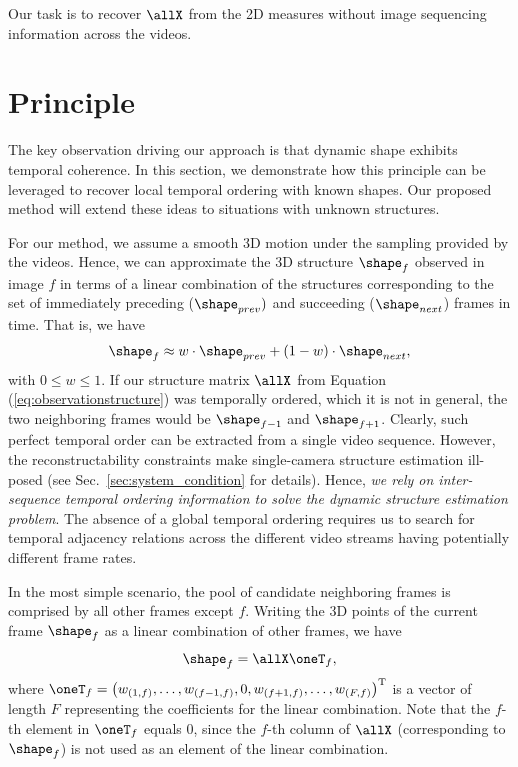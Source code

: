 Our task is to recover  $\allX$ from the 2D measures without image sequencing information across the videos.



\section{Principle} \label{sec:principle}
The key observation driving our approach is that dynamic shape exhibits temporal coherence. In this section, we demonstrate how this principle can be leveraged to recover local temporal ordering with known shapes. Our proposed method will extend these ideas to situations with unknown structures.

For our method, we assume a smooth 3D motion under the sampling provided by the videos.
Hence, we can approximate the 3D structure  $\shape_f$ observed in image $f$ in terms of a linear combination of the structures corresponding to the set of immediately preceding ($\shape_{prev})$ and succeeding ($\shape_{next}$) frames in time.
That is, we have
\begin{equation}
\shape_f \approx w \cdot \shape_{prev} + (1-w) \cdot \shape_{next},
\label{eq:linear_comb_2}
\end{equation}
with $0 \leq w \leq 1$.
If our structure matrix $\allX$ from Equation (\ref{eq:observationstructure}) was temporally ordered, which it is not in general, the two neighboring frames would be $\shape_{f-1}$ and $\shape_{f+1}$.
Clearly, such perfect temporal order can be extracted from a single video sequence. However, the reconstructability constraints 
make single-camera structure estimation ill-posed (see Sec.~\ref{sec:system_condition} for details). Hence, \textit{we rely on inter-sequence temporal ordering information to solve the dynamic structure estimation problem}. The absence of a global temporal ordering requires us to search for temporal adjacency relations across the different video streams having potentially different frame rates. 

In the most simple scenario, the pool of candidate neighboring frames is comprised by all other frames except $f$.
Writing the 3D points of the current frame $\shape_f$ as a linear combination of other frames, we have
\begin{equation}
\shape_f = \allX  \oneT_f,
\end{equation}
where $\oneT_f=\left(w_{(1,f)}, \dotsc, w_{(f-1,f)}, 0, w_{(f+1,f)}, \dotsc, w_{(F,f)}\right)^\text{T}$
is a vector of length $F$ representing the coefficients for the linear combination.
Note that the $f$-th element in $\oneT_f$ equals 0, since the $f$-th column of $\allX$ (corresponding to $\shape_f$) is not used as an element of the linear combination. 

